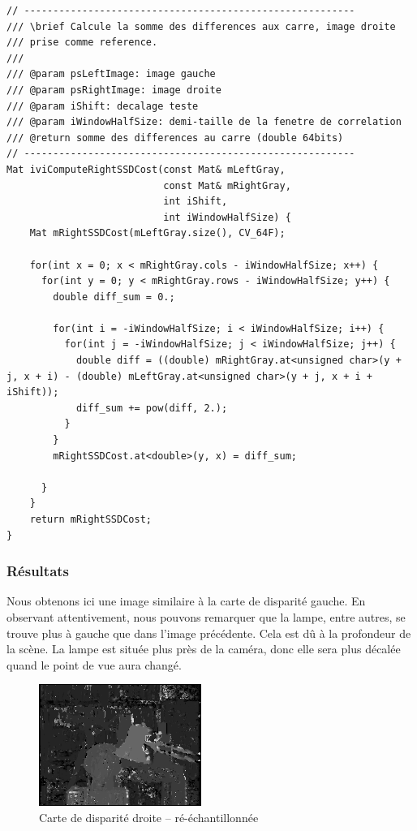 \documentclass[a4paper]{article}
\begin{document}
\clearpage
\begin{lstlisting}
// ---------------------------------------------------------
/// \brief Calcule la somme des differences aux carre, image droite
/// prise comme reference.
///
/// @param psLeftImage: image gauche
/// @param psRightImage: image droite
/// @param iShift: decalage teste
/// @param iWindowHalfSize: demi-taille de la fenetre de correlation
/// @return somme des differences au carre (double 64bits)
// ---------------------------------------------------------
Mat iviComputeRightSSDCost(const Mat& mLeftGray,
                           const Mat& mRightGray,
                           int iShift,
                           int iWindowHalfSize) {
    Mat mRightSSDCost(mLeftGray.size(), CV_64F);

    for(int x = 0; x < mRightGray.cols - iWindowHalfSize; x++) {
      for(int y = 0; y < mRightGray.rows - iWindowHalfSize; y++) {
        double diff_sum = 0.;

        for(int i = -iWindowHalfSize; i < iWindowHalfSize; i++) {
          for(int j = -iWindowHalfSize; j < iWindowHalfSize; j++) {
            double diff = ((double) mRightGray.at<unsigned char>(y + j, x + i) - (double) mLeftGray.at<unsigned char>(y + j, x + i + iShift));
            diff_sum += pow(diff, 2.);
          }
        }
        mRightSSDCost.at<double>(y, x) = diff_sum;

      }
    }
    return mRightSSDCost;
}
\end{lstlisting}
\clearpage
\subsubsection{Résultats}
Nous obtenons ici une image similaire à la carte de disparité gauche. En observant attentivement, nous pouvons remarquer que la lampe, entre autres, se trouve plus à gauche que dans l'image précédente. Cela est dû à la profondeur de la scène. La lampe est située plus près de la caméra, donc elle sera plus décalée quand le point de vue aura changé.

\begin{figure}[h]
\begin{center}
	\includegraphics[width=200px]{right-disparity_resampled.png}
\end{center}
\caption{Carte de disparité droite -- ré-échantillonnée}
\end{figure}
\end{document}
